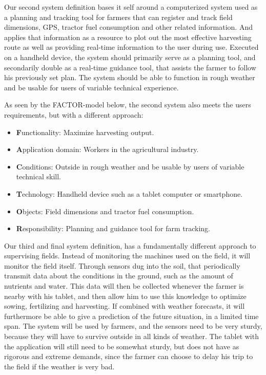 Our second system definition bases it self around a computerized system used as a planning and tracking tool for farmers that can register and track field dimensions, GPS, tractor fuel consumption and other related information. And applies that information as a resource to plot out the most effective harvesting route as well as providing real-time information to the user during use. Executed on a handheld device, the system should primarily serve as a planning tool, and secondarily double as a real-time guidance tool, that assists the farmer to follow his previously set plan. The system should be able to function in rough weather and be usable for users of variable technical experience.

As seen by the FACTOR-model below, the second system also meets the users requirements, but with a different approach:

\begin{itemize}[noitemsep]
    \item \textbf{F}unctionality: Maximize harvesting output.
    \item \textbf{A}pplication domain: Workers in the agricultural industry.
    \item \textbf{C}onditions: Outside in rough weather and be usable by users of variable technical skill.
    \item \textbf{T}echnology: Handheld device such as a tablet computer or smartphone.
    \item \textbf{O}bjects: Field dimensions and tractor fuel consumption.
    \item \textbf{R}esponsibility: Planning and guidance tool for farm tracking.
\end{itemize}

Our third and final system definition, has a fundamentally different approach to supervising fields. Instead of monitoring the machines used on the field, it will monitor the field itself. Through sensors dug into the soil, that periodically transmit data about the conditions in the ground, such as the amount of nutrients and water. This data will then be collected whenever the farmer is nearby with his tablet, and then allow him to use this knowledge to optimize sowing, fertilizing and harvesting. If combined with weather forecasts, it will furthermore be able to give a prediction of the future situation, in a limited time span. The system will be used by farmers, and the sensors need to be very sturdy, because they will have to survive outside in all kinds of weather. The tablet with the application will still need to be somewhat sturdy, but does not have as rigorous and extreme demands, since the farmer can choose to delay his trip to the field if the weather is very bad. 

